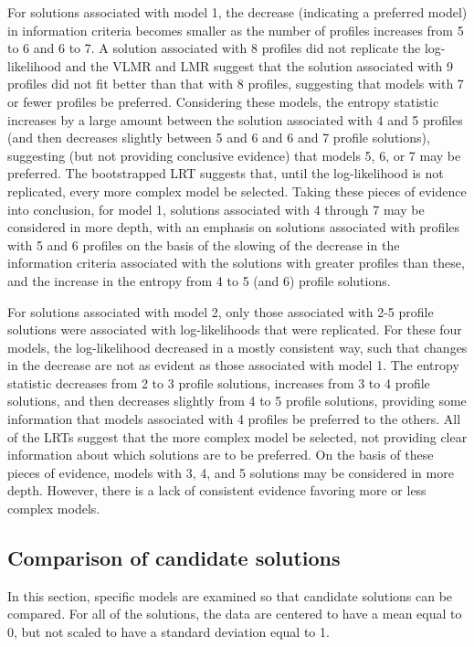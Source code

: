 \documentclass[]{msu-thesis}
\theoremstyle{definition}
\theoremstyle{definition}
\theoremstyle{definition}
\theoremstyle{remark}
\begin{document}
For solutions associated with model 1, the decrease (indicating a
preferred model) in information criteria becomes smaller as the number
of profiles increases from 5 to 6 and 6 to 7. A solution associated with
8 profiles did not replicate the log-likelihood and the VLMR and LMR
suggest that the solution associated with 9 profiles did not fit better
than that with 8 profiles, suggesting that models with 7 or fewer
profiles be preferred. Considering these models, the entropy statistic
increases by a large amount between the solution associated with 4 and 5
profiles (and then decreases slightly between 5 and 6 and 6 and 7
profile solutions), suggesting (but not providing conclusive evidence)
that models 5, 6, or 7 may be preferred. The bootstrapped LRT suggests
that, until the log-likelihood is not replicated, every more complex
model be selected. Taking these pieces of evidence into conclusion, for
model 1, solutions associated with 4 through 7 may be considered in more
depth, with an emphasis on solutions associated with profiles with 5 and
6 profiles on the basis of the slowing of the decrease in the
information criteria associated with the solutions with greater profiles
than these, and the increase in the entropy from 4 to 5 (and 6) profile
solutions.

For solutions associated with model 2, only those associated with 2-5
profile solutions were associated with log-likelihoods that were
replicated. For these four models, the log-likelihood decreased in a
mostly consistent way, such that changes in the decrease are not as
evident as those associated with model 1. The entropy statistic
decreases from 2 to 3 profile solutions, increases from 3 to 4 profile
solutions, and then decreases slightly from 4 to 5 profile solutions,
providing some information that models associated with 4 profiles be
preferred to the others. All of the LRTs suggest that the more complex
model be selected, not providing clear information about which solutions
are to be preferred. On the basis of these pieces of evidence, models
with 3, 4, and 5 solutions may be considered in more depth. However,
there is a lack of consistent evidence favoring more or less complex
models.

\subsection{Comparison of candidate
solutions}\label{comparison-of-candidate-solutions}

In this section, specific models are examined so that candidate
solutions can be compared. For all of the solutions, the data are
centered to have a mean equal to 0, but not scaled to have a standard
deviation equal to 1.
\end{document}
